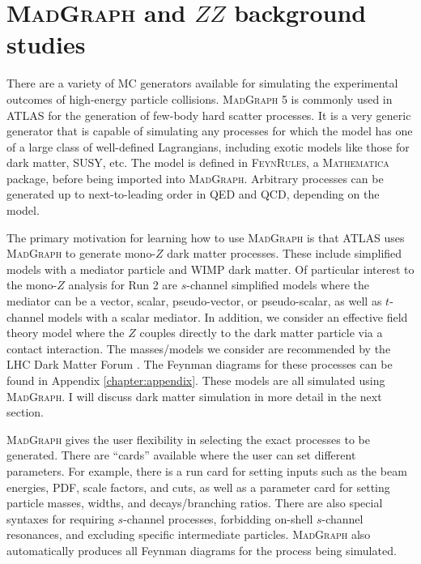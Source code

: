 \section{\textsc{MadGraph} and $ZZ$ background studies}
\label{sec:mg}

There are a variety of MC generators available for simulating the experimental outcomes of high-energy particle collisions. \textsc{MadGraph 5} \cite{Alwall:2011uj} is commonly used in ATLAS for the generation of few-body hard scatter processes. It is a very generic generator that is capable of simulating any processes for which the model has one of a large class of well-defined Lagrangians, including exotic models like those for dark matter, SUSY, etc. The model is defined in \textsc{FeynRules}, a \textsc{Mathematica} package, before being imported into \textsc{MadGraph}. Arbitrary processes can be generated up to next-to-leading order in QED and QCD, depending on the model.

The primary motivation for learning how to use \textsc{MadGraph} is that ATLAS uses \textsc{MadGraph} to generate mono-$Z$ dark matter processes. These include simplified models with a mediator particle and WIMP dark matter. Of particular interest to the mono-$Z$ analysis for Run 2 are $s$-channel simplified models where the mediator can be a vector, scalar, pseudo-vector, or pseudo-scalar, as well as $t$-channel models with a scalar mediator. In addition, we consider an effective field theory model where the $Z$ couples directly to the dark matter particle via a contact interaction. The masses/models we consider are recommended by the LHC Dark Matter Forum \cite{Abercrombie:2015wmb}. The Feynman diagrams for these processes can be found in Appendix \ref{chapter:appendix}. These models are all simulated using \textsc{MadGraph}. I will discuss dark matter simulation in more detail in the next section.

\textsc{MadGraph} gives the user flexibility in selecting the exact processes to be generated. There are ``cards'' available where the user can set different parameters. For example, there is a run card for setting inputs such as the beam energies, PDF, scale factors, and cuts, as well as a parameter card for setting particle masses, widths, and decays/branching ratios. There are also special syntaxes for requiring $s$-channel processes, forbidding on-shell $s$-channel resonances, and excluding specific intermediate particles. \textsc{MadGraph} also automatically produces all Feynman diagrams for the process being simulated.

